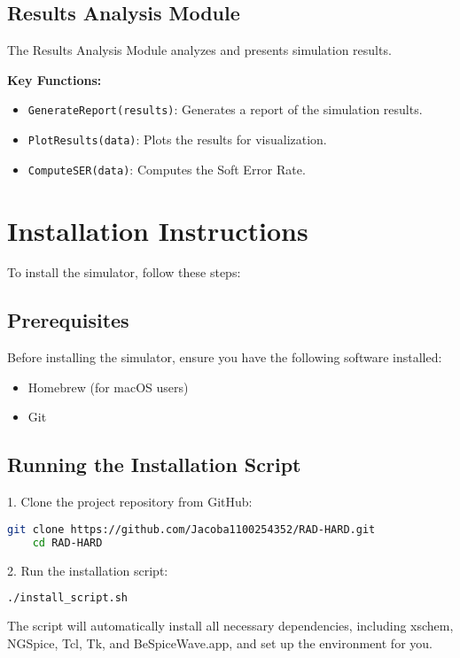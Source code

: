 \documentclass[12pt]{article}
\begin{document}
\subsection{Results Analysis Module}
The Results Analysis Module analyzes and presents simulation results.

\textbf{Key Functions:}
\begin{itemize}
    \item \texttt{GenerateReport(results)}: Generates a report of the simulation results.
    \item \texttt{PlotResults(data)}: Plots the results for visualization.
    \item \texttt{ComputeSER(data)}: Computes the Soft Error Rate.
\end{itemize}

\section{Installation Instructions}
To install the simulator, follow these steps:

\subsection{Prerequisites}
Before installing the simulator, ensure you have the following software installed:
\begin{itemize}
    \item Homebrew (for macOS users)
    \item Git
\end{itemize}

\subsection{Running the Installation Script}
1. Clone the project repository from GitHub:
    \begin{lstlisting}[language=bash, breaklines=true]
    git clone https://github.com/Jacoba1100254352/RAD-HARD.git
    cd RAD-HARD
    \end{lstlisting}

2. Run the installation script:
    \begin{lstlisting}[language=bash, breaklines=true]
    ./install_script.sh
    \end{lstlisting}

The script will automatically install all necessary dependencies, including xschem, NGSpice, Tcl, Tk, and BeSpiceWave.app, and set up the environment for you.
\end{document}
